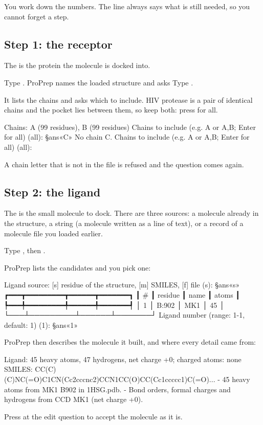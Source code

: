 You work down the numbers. The  line always says what is still
needed, so you cannot forget a step.

\subsection{Step 1: the receptor}

The  is the protein the molecule is docked into.

\begin{steps}
  \item Type . ProPrep names the loaded structure and asks
         Type .
  \item It lists the chains and asks which to include. HIV protease is a pair
        of identical chains and the pocket lies between them, so keep both:
        press  for all.
\begin{screen}
  Chains: A (99 residues), B (99 residues)
Chains to include (e.g. A or A,B; Enter for all) (all): §ans«C»
No chain C.
Chains to include (e.g. A or A,B; Enter for all) (all):
\end{screen}
\end{steps}

A chain letter that is not in the file is refused and the question comes
again.

\subsection{Step 2: the ligand}

The  is the small molecule to dock. There are three sources:
 a molecule already in the structure,  a  string (a
molecule written as a line of text), or  a record of a molecule file
you loaded earlier.

\begin{steps}
  \item Type , then .
  \item ProPrep lists the candidates and you pick one:
\begin{screen}
Ligand source: [s] residue of the structure, [m] SMILES, [f] file (s): §ans«s»
┏━━━┳━━━━━━━━━┳━━━━━━┳━━━━━━━┓
┃ # ┃ residue ┃ name ┃ atoms ┃
┡━━━╇━━━━━━━━━╇━━━━━━╇━━━━━━━┩
│ 1 │ B:902   │ MK1  │ 45    │
└───┴─────────┴──────┴───────┘
Ligand number (range: 1-1, default: 1) (1): §ans«1»
\end{screen}
  \item ProPrep then describes the molecule it built, and where every detail
        came from:
\begin{screen}
  Ligand: 45 heavy atoms, 47 hydrogens, net charge +0; charged atoms: none
  SMILES: CC(C)(C)NC(=O)C1CN(Cc2cccnc2)CCN1CC(O)CC(Cc1ccccc1)C(=O)...
  - 45 heavy atoms from MK1 B902 in 1HSG.pdb.
  - Bond orders, formal charges and hydrogens from CCD MK1 (net charge +0).
\end{screen}
  \item Press  at the edit question to accept the molecule as it
        is.
\end{steps}

